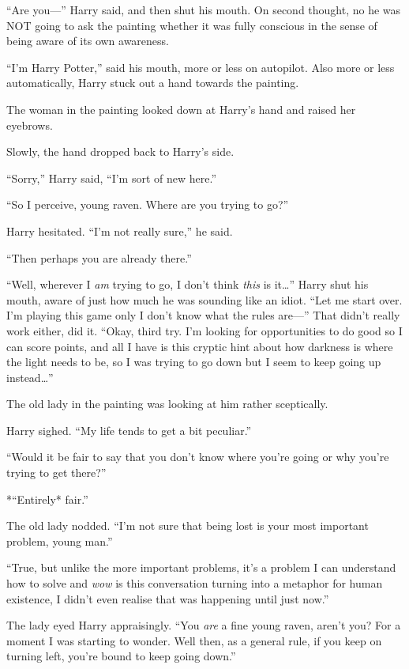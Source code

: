 ``Are you---'' Harry said, and then shut his mouth. On second thought,
no he was NOT going to ask the painting whether it was fully conscious
in the sense of being aware of its own awareness.

``I'm Harry Potter,'' said his mouth, more or less on autopilot. Also
more or less automatically, Harry stuck out a hand towards the painting.

The woman in the painting looked down at Harry's hand and raised her
eyebrows.

Slowly, the hand dropped back to Harry's side.

``Sorry,'' Harry said, ``I'm sort of new here.''

``So I perceive, young raven. Where are you trying to go?''

Harry hesitated. ``I'm not really sure,'' he said.

``Then perhaps you are already there.''

``Well, wherever I \emph{am} trying to go, I don't think \emph{this} is
it\ldots{}'' Harry shut his mouth, aware of just how much he was
sounding like an idiot. ``Let me start over. I'm playing this game only
I don't know what the rules are---'' That didn't really work either, did
it. ``Okay, third try. I'm looking for opportunities to do good so I can
score points, and all I have is this cryptic hint about how darkness is
where the light needs to be, so I was trying to go down but I seem to
keep going up instead\ldots{}''

The old lady in the painting was looking at him rather sceptically.

Harry sighed. ``My life tends to get a bit peculiar.''

``Would it be fair to say that you don't know where you're going or why
you're trying to get there?''

*``Entirely* fair.''

The old lady nodded. ``I'm not sure that being lost is your most
important problem, young man.''

``True, but unlike the more important problems, it's a problem I can
understand how to solve and \emph{wow} is this conversation turning into
a metaphor for human existence, I didn't even realise that was happening
until just now.''

The lady eyed Harry appraisingly. ``You \emph{are} a fine young raven,
aren't you? For a moment I was starting to wonder. Well then, as a
general rule, if you keep on turning left, you're bound to keep going
down.''

